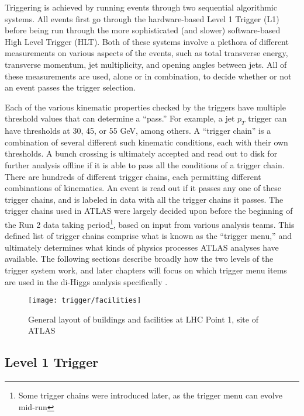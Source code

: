     Triggering is achieved by running events through two sequential algorithmic systems.
    All events first go through the hardware-based Level 1 Trigger (L1) before being run through the more sophisticated (and slower) software-based High Level Trigger (HLT).
    Both of these systems involve a plethora of different measurements on various aspects of the events, such as total transverse energy, transverse momentum, jet multiplicity, and opening angles between jets.
    All of these measurements are used, alone or in combination, to decide whether or not an event passes the trigger selection.

    Each of the various kinematic properties checked by the triggers have multiple threshold values that can determine a ``pass.''
    For example, a jet $p_T$ trigger can have thresholds at 30, 45, or 55 GeV, among others.
    A ``trigger chain'' is a combination of several different such kinematic conditions, each with their own thresholds.
    A bunch crossing is ultimately accepted and read out to disk for further analysis offline if it is able to pass all the conditions of a trigger chain.
    There are hundreds of different trigger chains, each permitting different combinations of kinematics.
    An event is read out if it passes any one of these trigger chains, and is labeled in data with all the trigger chains it passes.
    The trigger chains used in ATLAS were largely decided upon before the beginning of the Run 2 data taking period\footnote{
        Some trigger chains were introduced later, as the trigger menu can evolve mid-run
        }, based on input from various analysis teams.
    This defined list of trigger chains comprise what is known as the ``trigger menu,'' and ultimately determines what kinds of physics processes ATLAS analyses have available.
    The following sections describe broadly how the two levels of the trigger system work, and later chapters will focus on which trigger menu items are used in the di-Higgs analysis specifically .

    \begin{figure}[h]
        \texttt{[image: trigger/facilities]}
        \caption{General layout of buildings and facilities at LHC Point 1, site of ATLAS \cite{trigger_tdr}}
        \label{fig:facilities}
    \end{figure}


    \subsection{Level 1 Trigger}\label{sec:L1}

